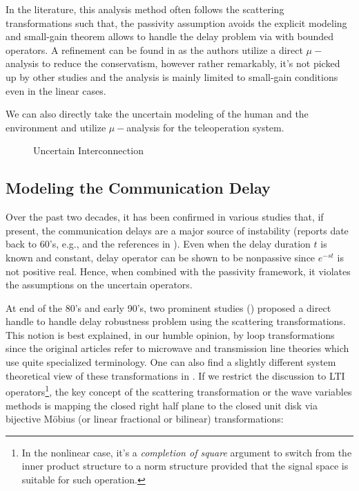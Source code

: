 In the literature, this analysis method often follows the scattering transformations such that, the passivity assumption avoids the
explicit modeling and small-gain theorem allows to handle the delay problem via with bounded operators. A refinement can be found 
 in \cite{poortenyokokohji} as the authors utilize a direct $\mu-$analysis to reduce the conservatism, however rather remarkably, it's not
picked up by other studies and the analysis is mainly limited to small-gain conditions even in the linear cases. 


We can also directly take the uncertain modeling of the human and the environment and utilize $\mu-$analysis for the teleoperation
system. 



\begin{figure}%
\centering%
\caption{Uncertain Interconnection}%
\label{fig:lit:uncincgeneral}%
\end{figure}



\subsection{Modeling the Communication Delay}

Over the past two decades, it has been confirmed in various studies that, if present, the communication delays are a major 
source of instability (reports date back to 60's, e.g., \cite{sheridanferrell} and the references in \cite{andersonspong}).
Even when the delay duration $t$ is known and constant, delay operator can be shown to be nonpassive since
$e^{-st}$ is not positive real. Hence, when combined with the passivity framework, it violates the assumptions on the uncertain
operators. 


At end of the 80's and early 90's, two prominent studies (\cite{andersonspong,nieslotine}) proposed a direct handle to handle delay 
robustness problem using the scattering transformations. This notion is best explained, in our humble opinion, by loop transformations 
since the original articles refer to microwave and transmission line theories which use quite specialized terminology. One can also
find a slightly different system theoretical view of these transformations in \cite{colgate3}. If we restrict the discussion to LTI
operators\footnote{In the nonlinear case, it's a \emph{completion of square} argument to switch from the inner product structure to a 
norm structure provided that the signal space is suitable for such operation.}, the key concept of the scattering transformation
or the wave variables methods is mapping the closed right half plane to the closed unit disk via bijective M\"{o}bius (or linear 
fractional or bilinear) transformations: 
 
